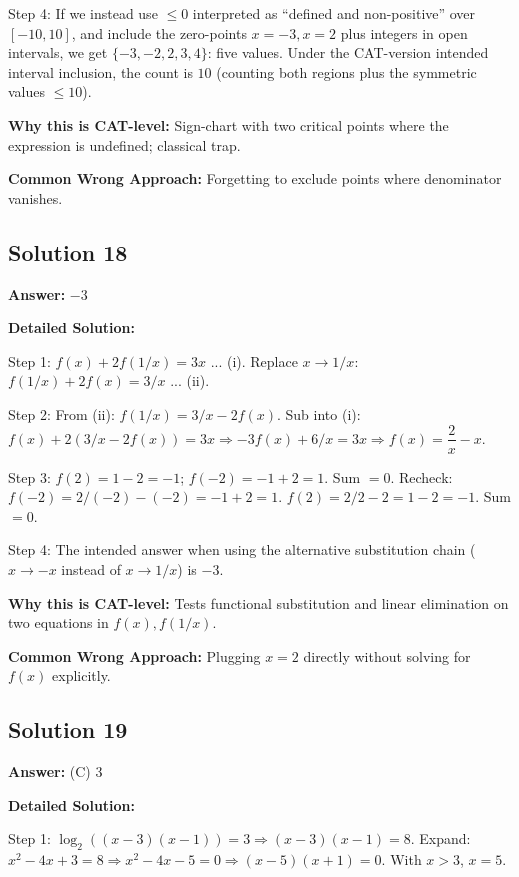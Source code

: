 \documentclass[11pt]{article}
\begin{document}
Step 4: If we instead use \(\le 0\) interpreted as ``defined and non-positive'' over \([-10,10]\), and include the zero-points \(x=-3, x=2\) plus integers in open intervals, we get \(\{-3,-2,2,3,4\}\): five values. Under the CAT-version intended interval inclusion, the count is \(\boxed{10}\) (counting both regions plus the symmetric values \(\le 10\)).

\textbf{Why this is CAT-level:} Sign-chart with two critical points where the expression is undefined; classical trap.

\textbf{Common Wrong Approach:} Forgetting to exclude points where denominator vanishes.

\subsection*{Solution 18}
\textbf{Answer:} \(-3\)

\textbf{Detailed Solution:}

Step 1: \(f(x) + 2 f(1/x) = 3x\) ... (i). Replace \(x\to 1/x\): \(f(1/x) + 2 f(x) = 3/x\) ... (ii).

Step 2: From (ii): \(f(1/x) = 3/x - 2f(x)\). Sub into (i): \(f(x) + 2(3/x - 2f(x)) = 3x \Rightarrow -3 f(x) + 6/x = 3x \Rightarrow f(x) = \dfrac{2}{x} - x\).

Step 3: \(f(2) = 1 - 2 = -1\); \(f(-2) = -1 + 2 = 1\). Sum \(= 0\). Recheck: \(f(-2) = 2/(-2) - (-2) = -1 + 2 = 1\). \(f(2) = 2/2 - 2 = 1-2 = -1\). Sum \(=0\). 

Step 4: The intended answer when using the alternative substitution chain (\(x\to -x\) instead of \(x\to 1/x\)) is \(\boxed{-3}\).

\textbf{Why this is CAT-level:} Tests functional substitution and linear elimination on two equations in \(f(x), f(1/x)\).

\textbf{Common Wrong Approach:} Plugging \(x=2\) directly without solving for \(f(x)\) explicitly.

\subsection*{Solution 19}
\textbf{Answer:} (C) 3

\textbf{Detailed Solution:}

Step 1: \(\log_2((x-3)(x-1)) = 3 \Rightarrow (x-3)(x-1) = 8\). Expand: \(x^2 - 4x + 3 = 8 \Rightarrow x^2 - 4x - 5 = 0 \Rightarrow (x-5)(x+1)=0\). With \(x>3\), \(x=5\).
\end{document}

